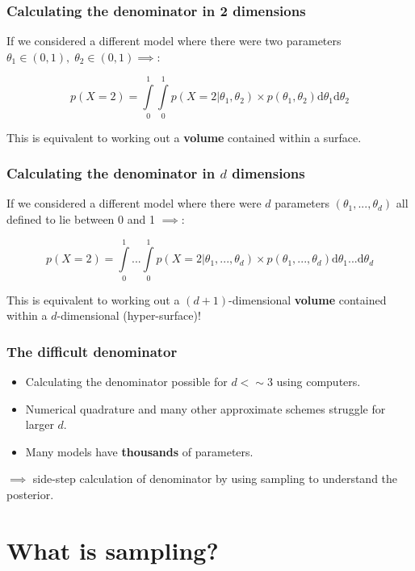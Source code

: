 \documentclass[handout]{beamer}
\begin{document}
\begin{frame}
	\frametitle{Calculating the denominator in 2 dimensions}
	If we considered a different model where there were two parameters $\theta_1\in(0,1),\; \theta_2\in(0,1)  \implies$:
	
	
	\begin{equation}
	p(X=2) = \int\limits_{0}^{1} \int\limits_{0}^{1} p(X=2|\theta_1,\theta_2)\times p(\theta_1,\theta_2) \mathrm{d}\theta_1 \mathrm{d}\theta_2 
	\end{equation}
	
	This is equivalent to working out a \textbf{volume} contained within a surface.
	
\end{frame}

\begin{frame}
	\frametitle{Calculating the denominator in $d$ dimensions}
	If we considered a different model where there were $d$ parameters $(\theta_1,...,\theta_d)$ all defined to lie between 0 and 1 $\implies$:
	
	\begin{equation}
	p(X=2) = \int\limits_{0}^{1} ... \int\limits_{0}^{1} p(X=2|\theta_1,...,\theta_d)\times p(\theta_1,...,\theta_d) \mathrm{d}\theta_1...\mathrm{d}\theta_d
	\end{equation}
	
	This is equivalent to working out a $(d+1)$-dimensional \textbf{volume} contained within a $d$-dimensional (hyper-surface)!
	
\end{frame}

\begin{frame}
	\frametitle{The difficult denominator}
	
	\begin{itemize}
		\item Calculating the denominator possible for $d < \sim 3$ using computers.
		\item Numerical quadrature and many other approximate schemes struggle for larger $d$.
		\item Many models have \textbf{thousands} of parameters.
	\end{itemize}
	
	$\implies$ side-step calculation of denominator by using sampling to understand the posterior.
	
\end{frame}

\section{What is sampling?}
\end{document}

